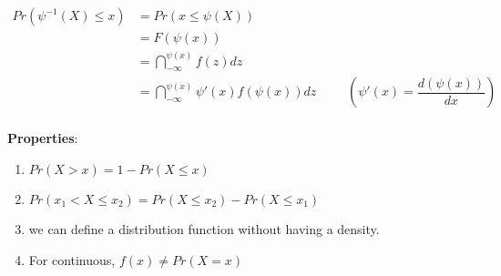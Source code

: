 \begin{align*}
    Pr(\psi^{-1}(X) \leq x) 
    &= Pr(x\leq\psi(X)) \\
    &= F(\psi(x)) \\
    &= \dint_{-\infty}^{\psi(x)} f(z)dz\\
    &= \dint_{-\infty}^{\psi(x)} \psi'(x) f(\psi(x))dz &&& \left( \psi'(x) = \dfrac{d(\psi(x))}{dx} \right)\\
\end{align*}

\textbf{Properties}:
\begin{enumerate}
    \item $Pr(X > x) = 1 - Pr(X \leq x)$

    \item $Pr(x_1 < X \leq x_2) = Pr(X \leq x_2) - Pr(X \leq x_1)$

    \item we can define a distribution function without having a density. 

    \item For continuous, $f(x) \neq Pr(X = x)$

\end{enumerate}



































